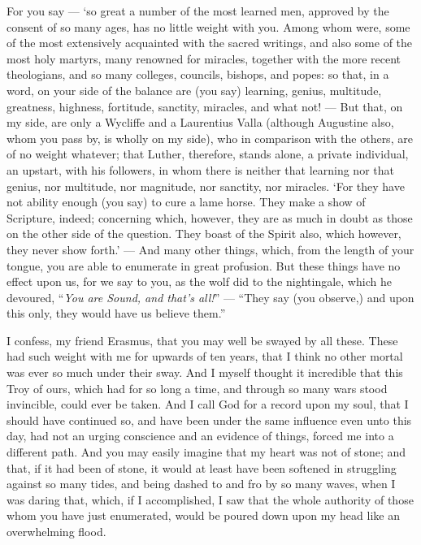 For you say — ‘so great a number of the most learned men, approved by the consent of so many ages, has no little weight with you. Among whom were, some of the most extensively acquainted with the sacred writings, and also some of the most holy martyrs, many renowned for miracles, together with the more recent theologians, and so many colleges, councils, bishops, and popes: so that, in a word, on your side of the balance are (you say) learning, genius, multitude, greatness, highness, fortitude, sanctity, miracles, and what not! — But that, on my side, are only a Wycliffe and a Laurentius Valla (although Augustine also, whom you pass by, is wholly on my side), who in comparison with the others, are of no weight whatever; that Luther, therefore, stands alone, a private individual, an upstart, with his followers, in whom there is neither that learning nor that genius, nor multitude, nor magnitude, nor sanctity, nor miracles. ‘For they have not ability enough (you say) to cure a lame horse. They make a show of Scripture, indeed; concerning which, however, they are as much in doubt as those on the other side of the question. They boast of the Spirit also, which however, they never show forth.’ — And many other things, which, from the length of your tongue, you are able to enumerate in great profusion. But these things have no effect upon us, for we say to you, as the wolf did to the nightingale, which he devoured, “\emph{You are Sound, and that’s all!}” — “They say (you observe,) and upon this only, they would have us believe them.”

I confess, my friend Erasmus, that you may well be swayed by all these. These had such weight with me for upwards of ten years, that I think no other mortal was ever so much under their sway. And I myself thought it incredible that this Troy of ours, which had for so long a time, and through so many wars stood invincible, could ever be taken. And I call God for a record upon my soul, that I should have continued so, and have been under the same influence even unto this day, had not an urging conscience and an evidence of things, forced me into a different path. And you may easily imagine that my heart was not of stone; and that, if it had been of stone, it would at least have been softened in struggling against so many tides, and being dashed to and fro by so many waves, when I was daring that, which, if I accomplished, I saw that the whole authority of those whom you have just enumerated, would be poured down upon my head like an overwhelming flood.


